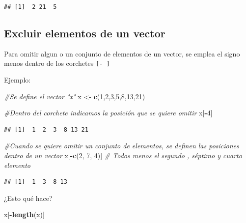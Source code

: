 \documentclass[
]{book}
\newenvironment{Shaded}{\begin{snugshade}}{\end{snugshade}}
\newcommand{\CommentTok}[1]{\textcolor[rgb]{0.56,0.35,0.01}{\textit{#1}}}
\newcommand{\DecValTok}[1]{\textcolor[rgb]{0.00,0.00,0.81}{#1}}
\newcommand{\FunctionTok}[1]{\textcolor[rgb]{0.13,0.29,0.53}{\textbf{#1}}}
\newcommand{\NormalTok}[1]{#1}
\newcommand{\OtherTok}[1]{\textcolor[rgb]{0.56,0.35,0.01}{#1}}
\newcommand{\SpecialCharTok}[1]{\textcolor[rgb]{0.81,0.36,0.00}{\textbf{#1}}}
\begin{document}
\begin{verbatim}
## [1]  2 21  5
\end{verbatim}

\subsection{Excluir elementos de un vector}\label{excluir-elementos-de-un-vector}

Para omitir algun o un conjunto de elementos de un vector, se emplea el signo menos dentro de los corchetes \texttt{{[}-\ {]}}

Ejemplo:

\begin{Shaded}
\begin{Highlighting}[]
\CommentTok{\#Se define el vector "x"}
\NormalTok{x }\OtherTok{\textless{}{-}} \FunctionTok{c}\NormalTok{(}\DecValTok{1}\NormalTok{,}\DecValTok{2}\NormalTok{,}\DecValTok{3}\NormalTok{,}\DecValTok{5}\NormalTok{,}\DecValTok{8}\NormalTok{,}\DecValTok{13}\NormalTok{,}\DecValTok{21}\NormalTok{)}

\CommentTok{\#Dentro del corchete indicamos la posición que se quiere omitir }
\NormalTok{x[}\SpecialCharTok{{-}}\DecValTok{4}\NormalTok{]}
\end{Highlighting}
\end{Shaded}

\begin{verbatim}
## [1]  1  2  3  8 13 21
\end{verbatim}

\begin{Shaded}
\begin{Highlighting}[]
\CommentTok{\#Cuando se quiere omitir un conjunto de elementos, se definen las posiciones dentro de un vector}
\NormalTok{x[}\SpecialCharTok{{-}}\FunctionTok{c}\NormalTok{(}\DecValTok{2}\NormalTok{, }\DecValTok{7}\NormalTok{, }\DecValTok{4}\NormalTok{)]   }\CommentTok{\# Todos menos el segundo , séptimo y cuarto elemento}
\end{Highlighting}
\end{Shaded}

\begin{verbatim}
## [1]  1  3  8 13
\end{verbatim}

¿Esto qué hace?

\begin{Shaded}
\begin{Highlighting}[]
\NormalTok{x[}\SpecialCharTok{{-}}\FunctionTok{length}\NormalTok{(x)]}
\end{Highlighting}
\end{Shaded}
\end{document}

